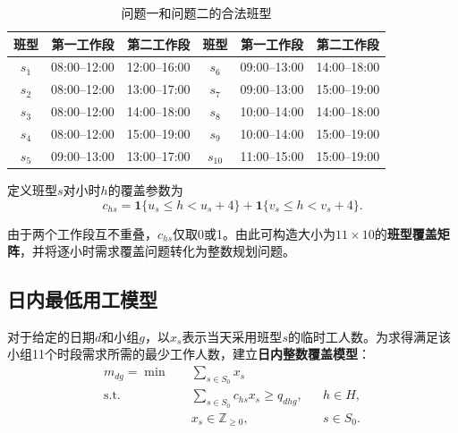 \documentclass[withoutpreface,bwprint]{cumcmthesis}
\newcommand{\ind}{\mathbf{1}}
\begin{document}
\begin{table}[H]
\centering
\caption{问题一和问题二的合法班型}
\label{tab:q12-shifts}
\begin{tabular}{cccccc}
\toprule
\textbf{班型} & \textbf{第一工作段} & \textbf{第二工作段}
& \textbf{班型} & \textbf{第一工作段} & \textbf{第二工作段}\\
\midrule
$s_1$ & 08:00--12:00 & 12:00--16:00
& $s_6$ & 09:00--13:00 & 14:00--18:00\\

$s_2$ & 08:00--12:00 & 13:00--17:00
& $s_7$ & 09:00--13:00 & 15:00--19:00\\

$s_3$ & 08:00--12:00 & 14:00--18:00
& $s_8$ & 10:00--14:00 & 14:00--18:00\\

$s_4$ & 08:00--12:00 & 15:00--19:00
& $s_9$ & 10:00--14:00 & 15:00--19:00\\

$s_5$ & 09:00--13:00 & 13:00--17:00
& $s_{10}$ & 11:00--15:00 & 15:00--19:00\\
\bottomrule
\end{tabular}
\end{table}

定义班型$s$对小时$h$的覆盖参数为
\begin{equation}
c_{hs}
=
\ind\{u_s\leq h<u_s+4\}
+
\ind\{v_s\leq h<v_s+4\}.
\label{eq:q12-shift-cover}
\end{equation}

由于两个工作段互不重叠，$c_{hs}$仅取0或1。由此可构造大小为$11\times10$的\textbf{班型覆盖矩阵}，并将逐小时需求覆盖问题转化为整数规划问题。

\subsection{日内最低用工模型}

对于给定的日期$d$和小组$g$，以$x_s$表示当天采用班型$s$的临时工人数。为求得满足该小组11个时段需求所需的最少工作人数，建立\textbf{日内整数覆盖模型}：
\begin{equation}
\begin{aligned}
m_{dg}=\min\quad
&\sum_{s\in S_0}x_s\\
\mathrm{s.t.}\quad
&\sum_{s\in S_0}c_{hs}x_s
\geq q_{dhg},
&&h\in H,\\
&x_s\in\mathbb{Z}_{\geq0},
&&s\in S_0.
\end{aligned}
\label{eq:q1-daily-cover}
\end{equation}
\end{document}
